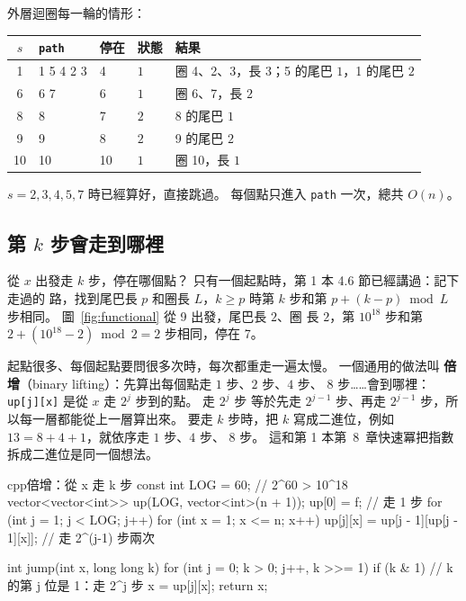 
外層迴圈每一輪的情形：

\begin{center}
\begin{tabular}{cllll}
\toprule
$s$ & \texttt{path} & 停在 & 狀態 & 結果 \\
\midrule
1 & 1 5 4 2 3 & 4 & $1$ & 圈 4、2、3，長 $3$；5 的尾巴 $1$，1 的尾巴 $2$ \\
6 & 6 7 & 6 & $1$ & 圈 6、7，長 $2$ \\
8 & 8 & 7 & $2$ & 8 的尾巴 $1$ \\
9 & 9 & 8 & $2$ & 9 的尾巴 $2$ \\
10 & 10 & 10 & $1$ & 圈 10，長 $1$ \\
\bottomrule
\end{tabular}
\end{center}

$s = 2, 3, 4, 5, 7$ 時已經算好，直接跳過。 每個點只進入 \texttt{path} 一次，總共 $O(n)$。

\subsection{第 $k$ 步會走到哪裡}

從 $x$ 出發走 $k$ 步，停在哪個點？ 只有一個起點時，第 1 本 4.6 節已經講過：記下走過的
路，找到尾巴長 $p$ 和圈長 $L$，$k \ge p$ 時第 $k$ 步和第
$p + (k - p) \bmod L$ 步相同。 圖~\ref{fig:functional} 從 9 出發，尾巴長 $2$、圈
長 $2$，第 $10^{18}$ 步和第 $2 + (10^{18} - 2) \bmod 2 = 2$ 步相同，停在 7。

起點很多、每個起點要問很多次時，每次都重走一遍太慢。 一個通用的做法叫
\textbf{倍增}（binary lifting）：先算出每個點走 $1$ 步、$2$ 步、$4$ 步、
$8$ 步……會到哪裡：\texttt{up[j][x]} 是從 $x$ 走 $2^j$ 步到的點。 走 $2^j$ 步
等於先走 $2^{j-1}$ 步、再走 $2^{j-1}$ 步，所以每一層都能從上一層算出來。 要走
$k$ 步時，把 $k$ 寫成二進位，例如 $13 = 8 + 4 + 1$，就依序走 $1$ 步、$4$ 步、
$8$ 步。 這和第 1 本第~8~章快速冪把指數拆成二進位是同一個想法。

\begin{code}{cpp}{倍增：從 x 走 k 步}
const int LOG = 60;                    // 2^60 > 10^18
vector<vector<int>> up(LOG, vector<int>(n + 1));
up[0] = f;                             // 走 1 步
for (int j = 1; j < LOG; j++) {
    for (int x = 1; x <= n; x++) {
        up[j][x] = up[j - 1][up[j - 1][x]];   // 走 2^(j-1) 步兩次
    }
}

int jump(int x, long long k) {
    for (int j = 0; k > 0; j++, k >>= 1) {
        if (k & 1) {                   // k 的第 j 位是 1：走 2^j 步
            x = up[j][x];
        }
    }
    return x;
}
\end{code}

